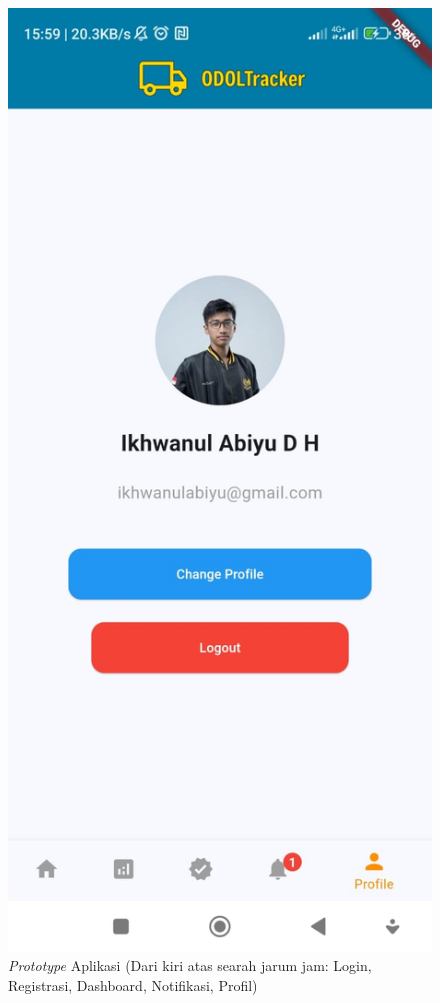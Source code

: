 \begin{figure}[htbp]
  \includegraphics[scale=0.2]{gambar/bab3-profile.jpeg}

  \caption{\centering \emph{Prototype} Aplikasi (Dari kiri atas searah jarum jam: Login, Registrasi, Dashboard, Notifikasi, Profil)}
  \label{fig:prototype}
\end{figure}

